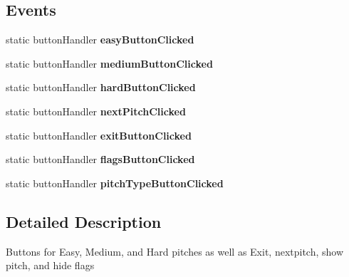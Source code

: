 \begin{DoxyCompactItemize}
\end{DoxyCompactItemize}
\subsection*{Events}
\begin{DoxyCompactItemize}
\item 
static button\+Handler {\bfseries easy\+Button\+Clicked}\hypertarget{class_u_i_events_ad1544529b7f816993cfd210464362bb2}{}\label{class_u_i_events_ad1544529b7f816993cfd210464362bb2}

\item 
static button\+Handler {\bfseries medium\+Button\+Clicked}\hypertarget{class_u_i_events_a4176171563d4ce0db2a3cb4c43698a20}{}\label{class_u_i_events_a4176171563d4ce0db2a3cb4c43698a20}

\item 
static button\+Handler {\bfseries hard\+Button\+Clicked}\hypertarget{class_u_i_events_aa4e7a0cf10e37fa57a1c3f57672d420d}{}\label{class_u_i_events_aa4e7a0cf10e37fa57a1c3f57672d420d}

\item 
static button\+Handler {\bfseries next\+Pitch\+Clicked}\hypertarget{class_u_i_events_af23690fd635e7f23542ca113ba6e5c61}{}\label{class_u_i_events_af23690fd635e7f23542ca113ba6e5c61}

\item 
static button\+Handler {\bfseries exit\+Button\+Clicked}\hypertarget{class_u_i_events_ac5b1e2172d13f95a98006179f96367c0}{}\label{class_u_i_events_ac5b1e2172d13f95a98006179f96367c0}

\item 
static button\+Handler {\bfseries flags\+Button\+Clicked}\hypertarget{class_u_i_events_ae2ecd6b7156c9c62069fecb2074f2c67}{}\label{class_u_i_events_ae2ecd6b7156c9c62069fecb2074f2c67}

\item 
static button\+Handler {\bfseries pitch\+Type\+Button\+Clicked}\hypertarget{class_u_i_events_a881445f1853a936b98e326c2ba042ca7}{}\label{class_u_i_events_a881445f1853a936b98e326c2ba042ca7}

\end{DoxyCompactItemize}


\subsection{Detailed Description}
Buttons for Easy, Medium, and Hard pitches as well as Exit, nextpitch, show pitch, and hide flags 



